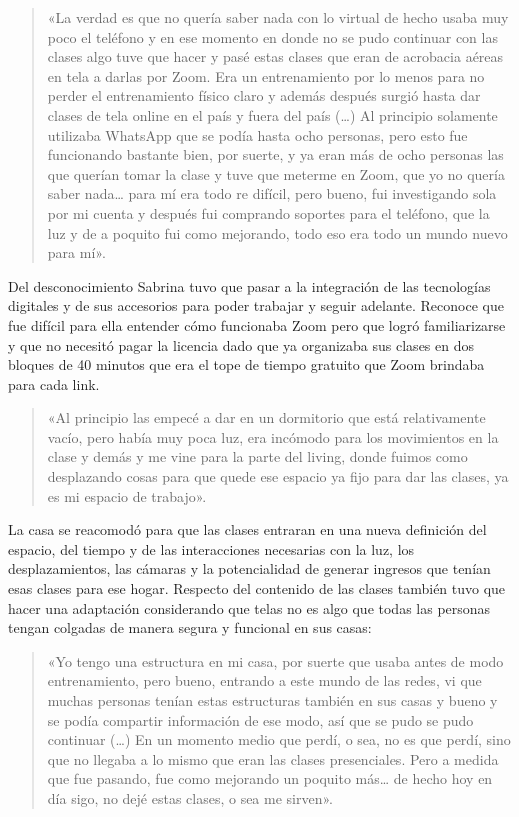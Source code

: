 \begin{quote}
«La verdad es que no quería saber nada con lo virtual de hecho usaba muy poco el teléfono y en ese momento en donde no se pudo continuar con las clases algo tuve que hacer y pasé estas clases que eran de acrobacia aéreas en tela a darlas por Zoom. Era un entrenamiento por lo menos para no perder el entrenamiento físico claro y además después surgió hasta dar clases de tela online en el país y fuera del país (\ldots) Al principio solamente utilizaba WhatsApp que se podía hasta ocho personas, pero esto fue funcionando bastante bien, por suerte, y ya eran más de ocho personas las que querían tomar la clase y tuve que meterme en Zoom, que yo no quería saber nada\ldots{} para mí era todo re difícil, pero bueno, fui investigando sola por mi cuenta y después fui comprando soportes para el teléfono, que la luz y de a poquito fui como mejorando, todo eso era todo un mundo nuevo para mí».
\end{quote}

Del desconocimiento Sabrina tuvo que pasar a la integración de las tecnologías digitales y de sus accesorios para poder trabajar y seguir adelante. Reconoce que fue difícil para ella entender cómo funcionaba Zoom pero que logró familiarizarse y que no necesitó pagar la licencia dado que ya organizaba sus clases en dos bloques de 40 minutos que era el tope de tiempo gratuito que Zoom brindaba para cada link.

\begin{quote}
«Al principio las empecé a dar en un dormitorio que está relativamente vacío, pero había muy poca luz, era incómodo para los movimientos en la clase y demás y me vine para la parte del living, donde fuimos como desplazando cosas para que quede ese espacio ya fijo para dar las clases, ya es mi espacio de trabajo».
\end{quote}

La casa se reacomodó para que las clases entraran en una nueva definición del espacio, del tiempo y de las interacciones necesarias con la luz, los desplazamientos, las cámaras y la potencialidad de generar ingresos que tenían esas clases para ese hogar. Respecto del contenido de las clases también tuvo que hacer una adaptación considerando que telas no es algo que todas las personas tengan colgadas de manera segura y funcional en sus casas:

\begin{quote}
«Yo tengo una estructura en mi casa, por suerte que usaba antes de modo entrenamiento, pero bueno, entrando a este mundo de las redes, vi que muchas personas tenían estas estructuras también en sus casas y bueno y se podía compartir información de ese modo, así que se pudo se pudo continuar (\ldots) En un momento medio que perdí, o sea, no es que perdí, sino que no llegaba a lo mismo que eran las clases presenciales. Pero a medida que fue pasando, fue como mejorando un poquito más\ldots{} de hecho hoy en día sigo, no dejé estas clases, o sea me sirven».
\end{quote}

